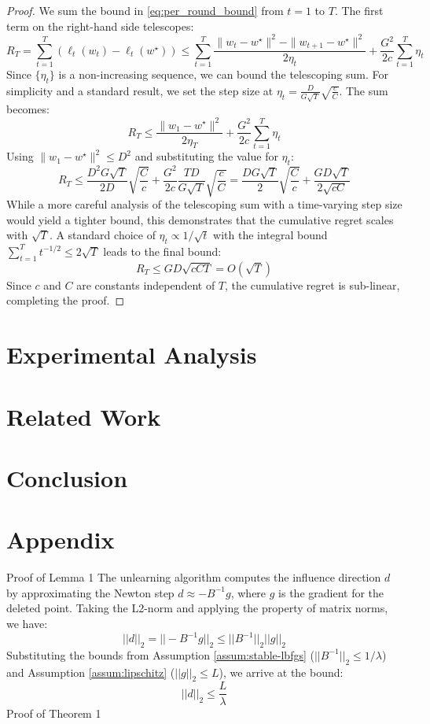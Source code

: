 \documentclass[a4paper,12pt]{article}
\begin{document}
\begin{proof}
We sum the bound in \eqref{eq:per_round_bound} from $t=1$ to $T$. The first term on the right-hand side telescopes:
$$
R_T = \sum_{t=1}^T (\ell_t(w_t) - \ell_t(w^\star)) \le \sum_{t=1}^T \frac{\|w_t - w^\star\|^2 - \|w_{t+1} - w^\star\|^2}{2\eta_t} + \frac{G^2}{2c}\sum_{t=1}^T \eta_t
$$
Since $\{\eta_t\}$ is a non-increasing sequence, we can bound the telescoping sum. For simplicity and a standard result, we set the step size at $\eta_t = \frac{D}{G\sqrt{T}}\sqrt{\frac{c}{C}}$. The sum becomes:
$$
R_T \le \frac{\|w_1 - w^\star\|^2}{2\eta_T} + \frac{G^2}{2c}\sum_{t=1}^T \eta_t
$$
Using $\|w_1 - w^\star\|^2 \le D^2$ and substituting the value for $\eta_t$:
$$
R_T \le \frac{D^2 G \sqrt{T}}{2D}\sqrt{\frac{C}{c}} + \frac{G^2}{2c} \frac{TD}{G\sqrt{T}}\sqrt{\frac{c}{C}} = \frac{DG\sqrt{T}}{2}\sqrt{\frac{C}{c}} + \frac{GD\sqrt{T}}{2\sqrt{c C}}
$$
While a more careful analysis of the telescoping sum with a time-varying step size would yield a tighter bound, this demonstrates that the cumulative regret scales with $\sqrt{T}$. A standard choice of $\eta_t \propto 1/\sqrt{t}$ with the integral bound $\sum_{t=1}^T t^{-1/2} \le 2\sqrt{T}$ leads to the final bound:
$$
R_T \le GD\sqrt{cCT} = O(\sqrt{T})
$$
Since $c$ and $C$ are constants independent of $T$, the cumulative regret is sub-linear, completing the proof.
\end{proof}


\section{Experimental Analysis}

\section{Related Work}

\section{Conclusion}


\section{Appendix}

Proof of Lemma 1
The unlearning algorithm computes the influence direction $d$ by approximating the Newton step $d \approx -B^{-1}g$, where $g$ is the gradient for the deleted point. Taking the L2-norm and applying the property of matrix norms, we have:
$$
||d||_2 = ||-B^{-1}g||_2 \le ||B^{-1}||_2 ||g||_2
$$
Substituting the bounds from Assumption \ref{assum:stable-lbfgs} ($||B^{-1}||_2 \leq 1/\lambda$) and Assumption \ref{assum:lipschitz} ($||g||_2 \leq L$), we arrive at the bound:
$$
||d||_2 \le \frac{L}{\lambda}
$$
Proof of Theorem 1
\end{document}
